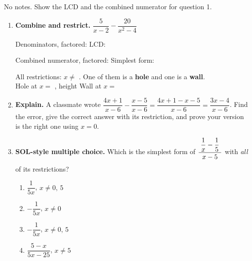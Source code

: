 \documentclass[10pt]{article}
\newcommand{\TallMath}[1]{$\displaystyle #1\rule[-1.4em]{0pt}{3.2em}$}
\begin{document}
\namedateperiod

\vspace{0.08in}

No notes. Show the LCD and the combined numerator for question 1.

\vspace{0.06in}

\begin{enumerate}[leftmargin=1.8em, itemsep=9pt]
  \item \textbf{Combine and restrict.} \; $\dfrac{5}{x-2}-\dfrac{20}{x^2-4}$

        \vspace{4pt}
        Denominators, factored: \blank{4.6cm} \quad LCD: \blank{2.8cm}

        \vspace{4pt}
        Combined numerator, factored: \blank{2.6cm} \quad Simplest form: \blank{2.0cm}

        \vspace{4pt}
        All restrictions: $x\neq$ \blank{2.0cm}. \; One of them is a \textbf{hole} and one is a
        \textbf{wall}. \\[3pt]
        Hole at $x=$ \blank{1.0cm}, height \blank{1.2cm} \qquad Wall at $x=$ \blank{1.0cm}

  \item \textbf{Explain.} A classmate wrote
        $\dfrac{4x+1}{x-6}-\dfrac{x-5}{x-6}=\dfrac{4x+1-x-5}{x-6}=\dfrac{3x-4}{x-6}$.
        Find the error, give the correct answer with its restriction, and prove your version is the
        right one using $x=0$.

  \item \textbf{SOL-style multiple choice.} Which is the simplest form of
        \; \TallMath{\frac{\;\dfrac{1}{x}-\dfrac{1}{5}\;}{\;x-5\;}} \; with \emph{all} of its
        restrictions?
        \begin{enumerate}[label=\Alph*., leftmargin=1.9em, itemsep=1pt]
          \item $\dfrac{1}{5x}$, \; $x\neq0,\,5$
          \item $-\dfrac{1}{5x}$, \; $x\neq0$
          \item $-\dfrac{1}{5x}$, \; $x\neq0,\,5$
          \item $\dfrac{5-x}{5x-25}$, \; $x\neq5$
        \end{enumerate}
\end{enumerate}
\end{document}
